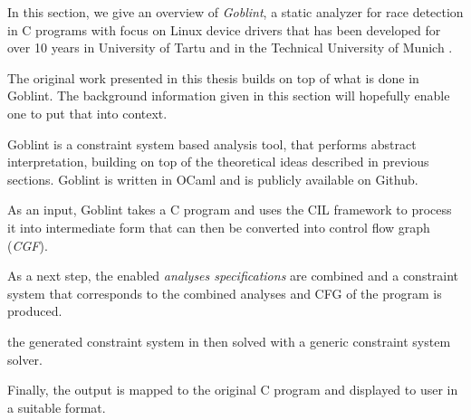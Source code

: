 \documentclass[..thesis.tex]{subfiles}
\begin{document}

In this section, we give an overview  of \textit{Goblint}, a static analyzer for race detection in C programs with focus on Linux device drivers that has been developed for over 10 years in University of Tartu and in the Technical University of Munich \cite{_goblint_????,apinis_frameworks_2014,vojdanivesal_static_2010}.




The original work presented in this thesis builds on top of what is done in Goblint. The background information given in this section will hopefully enable one to put that into context.


Goblint is a constraint system based analysis tool, that performs abstract interpretation, building on top of the theoretical ideas described in previous sections. Goblint is written in OCaml and is publicly available on Github.

As an input, Goblint takes a C program and uses the CIL framework to process it into intermediate form that can then be converted into control flow graph (\textit{CGF}). 


As a next step, the enabled \textit{analyses specifications} are combined and a constraint system that corresponds to the combined analyses and CFG of the program is produced.

the generated constraint system in then solved with a generic constraint system solver. 

Finally, the output is mapped to the original C program and displayed to user in a suitable format.
\end{document}
